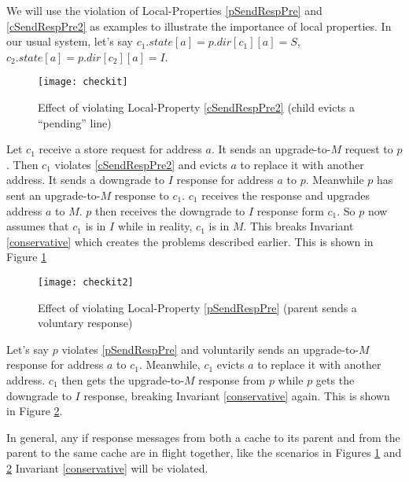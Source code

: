  We will use the violation of Local-Properties \ref{pSendRespPre} and
\ref{cSendRespPre2} as examples to illustrate the importance of local
properties.  In our usual system, let's say $c_1.state[a] = p.dir[c_1][a] = S$,
$c_2.state[a] = p.dir[c_2][a] = I$.

\begin{figure}
\centering
\texttt{[image: checkit]}
\caption{Effect of violating Local-Property \ref{cSendRespPre2} (child evicts a ``pending'' line)}
\label{checkit}
\end{figure}

Let $c_1$ receive a store request for address $a$. It sends an upgrade-to-$M$
request to $p$. Then $c_1$ violates \ref{cSendRespPre2} and evicts $a$ to
replace it with another address. It sends a downgrade to $I$ response for
address $a$ to $p$.  Meanwhile $p$ has sent an upgrade-to-$M$ response to
$c_1$. $c_1$ receives the response and upgrades address $a$ to $M$. $p$ then
receives the downgrade to $I$ response form $c_1$. So $p$ now assumes that
$c_1$ is in $I$ while in reality, $c_1$ is in $M$. This breaks Invariant
\ref{conservative} which creates the problems described earlier. This is shown
in Figure \ref{checkit}

\begin{figure}
\centering
\texttt{[image: checkit2]}
\caption{Effect of violating Local-Property \ref{pSendRespPre} (parent sends a voluntary response)}
\label{checkit2}
\end{figure}

Let's say $p$ violates \ref{pSendRespPre} and voluntarily sends an
upgrade-to-$M$ response for address $a$ to $c_1$.  Meanwhile, $c_1$ evicts $a$
to replace it with another address. $c_1$ then gets the upgrade-to-$M$ response
from $p$ while $p$ gets the downgrade to $I$ response, breaking Invariant
\ref{conservative} again. This is shown in Figure \ref{checkit2}.

In general, any if response messages from both a cache to its parent and from
the parent to the same cache are in flight together, like the scenarios in
Figures \ref{checkit} and \ref{checkit2} Invariant \ref{conservative} will be
violated.


